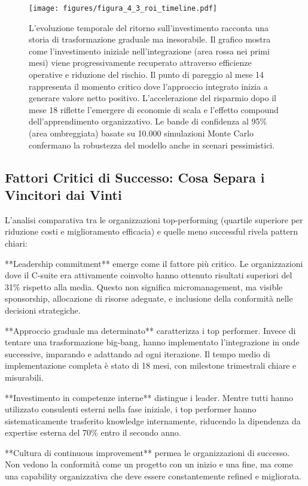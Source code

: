 \begin{figure}[htbp]
\centering
\texttt{[image: figures/figura\_4\_3\_roi\_timeline.pdf]}
\caption{L'evoluzione temporale del ritorno sull'investimento racconta una storia di trasformazione graduale ma inesorabile. Il grafico mostra come l'investimento iniziale nell'integrazione (area rossa nei primi mesi) viene progressivamente recuperato attraverso efficienze operative e riduzione del rischio. Il punto di pareggio al mese 14 rappresenta il momento critico dove l'approccio integrato inizia a generare valore netto positivo. L'accelerazione del risparmio dopo il mese 18 riflette l'emergere di economie di scala e l'effetto compound dell'apprendimento organizzativo. Le bande di confidenza al 95\% (area ombreggiata) basate su 10.000 simulazioni Monte Carlo confermano la robustezza del modello anche in scenari pessimistici.}
\label{fig:roi_timeline}
\end{figure}

\subsection{Fattori Critici di Successo: Cosa Separa i Vincitori dai Vinti}

L'analisi comparativa tra le organizzazioni top-performing (quartile superiore per riduzione costi e miglioramento efficacia) e quelle meno successful rivela pattern chiari:

**Leadership commitment** emerge come il fattore più critico. Le organizzazioni dove il C-suite era attivamente coinvolto hanno ottenuto risultati superiori del 31\% rispetto alla media. Questo non significa micromanagement, ma visible sponsorship, allocazione di risorse adeguate, e inclusione della conformità nelle decisioni strategiche.

**Approccio graduale ma determinato** caratterizza i top performer. Invece di tentare una trasformazione big-bang, hanno implementato l'integrazione in onde successive, imparando e adattando ad ogni iterazione. Il tempo medio di implementazione completa è stato di 18 mesi, con milestone trimestrali chiare e misurabili.

**Investimento in competenze interne** distingue i leader. Mentre tutti hanno utilizzato consulenti esterni nella fase iniziale, i top performer hanno sistematicamente trasferito knowledge internamente, riducendo la dipendenza da expertise esterna del 70\% entro il secondo anno.

**Cultura di continuous improvement** permea le organizzazioni di successo. Non vedono la conformità come un progetto con un inizio e una fine, ma come una capability organizzativa che deve essere constantemente refined e migliorata.

